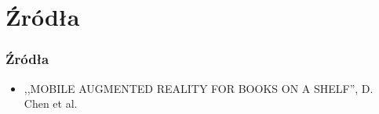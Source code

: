 \section{Źródła}

\begin{frame}
    \frametitle{Źródła}
    \begin{itemize}
        \item ,,MOBILE AUGMENTED REALITY FOR BOOKS ON A SHELF'', D. Chen et al.
    \end{itemize}
\end{frame}

